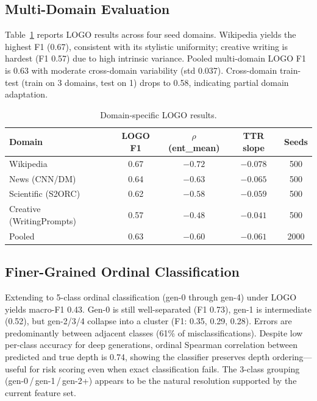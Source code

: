 \documentclass[letterpaper]{article}
\begin{document}
\subsection{Multi-Domain Evaluation}
\label{sec:domain}

Table~\ref{tab:domain} reports LOGO results across four seed domains.
Wikipedia yields the highest F1 (0.67), consistent with its stylistic uniformity; creative writing is hardest (F1 0.57) due to high intrinsic variance.
Pooled multi-domain LOGO F1 is 0.63 with moderate cross-domain variability (std 0.037).
Cross-domain train-test (train on 3 domains, test on 1) drops to 0.58, indicating partial domain adaptation.

\begin{table}[h]
\centering
\caption{Domain-specific LOGO results.}
\label{tab:domain}
\begin{tabular}{lcccc}
\toprule
Domain & LOGO F1 & $\rho$ (ent\_mean) & TTR slope & Seeds \\
\midrule
Wikipedia & 0.67 & $-0.72$ & $-0.078$ & 500 \\
News (CNN/DM) & 0.64 & $-0.63$ & $-0.065$ & 500 \\
Scientific (S2ORC) & 0.62 & $-0.58$ & $-0.059$ & 500 \\
Creative (WritingPrompts) & 0.57 & $-0.48$ & $-0.041$ & 500 \\
\midrule
Pooled & 0.63 & $-0.60$ & $-0.061$ & 2000 \\
\bottomrule
\end{tabular}
\end{table}

\subsection{Finer-Grained Ordinal Classification}
\label{sec:ordinal}

Extending to 5-class ordinal classification (gen-0 through gen-4) under LOGO yields macro-F1 0.43.
Gen-0 is still well-separated (F1 0.73), gen-1 is intermediate (0.52), but gen-2/3/4 collapse into a cluster (F1: 0.35, 0.29, 0.28).
Errors are predominantly between adjacent classes (61\% of misclassifications).
Despite low per-class accuracy for deep generations, ordinal Spearman correlation between predicted and true depth is 0.74, showing the classifier preserves depth ordering---useful for risk scoring even when exact classification fails.
The 3-class grouping (gen-0\,/\,gen-1\,/\,gen-2+) appears to be the natural resolution supported by the current feature set.
\end{document}
